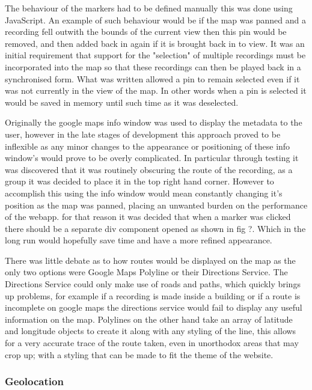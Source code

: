 \documentclass{l3proj}
\begin{document}
The behaviour of the markers had to be defined manually this was done using JavaScript. An example of such behaviour would be if the map was panned and a recording fell outwith the bounds of the current view then this pin would be removed, and then added back in again if it is brought back in to view. It was an initial requirement that support for the "selection" of multiple recordings must be incorporated into the map so that these recordings can then be played back in a synchronised form. What was written allowed a pin to remain selected even if it was not currently in the view of the map. In other words when a pin is selected it would be saved in memory until such time as it was deselected.

Originally the google maps info window was used to display the metadata to the user, however in the late stages of development this approach proved to be inflexible as any minor changes to the appearance or positioning of these info window’s would prove to be overly complicated. In particular through testing it was discovered that it was routinely obscuring the route of the recording, as a group it was decided to place it in the top right hand corner. However to accomplish this using the info window would mean constantly changing it's position as the map was panned, placing an unwanted burden on the performance of the webapp. for that reason it was decided that when a marker was clicked there should be a separate div component opened as shown in fig ?. Which in the long run would hopefully save time and have a more refined appearance.

There was little debate as to how routes would be displayed on the map as the only two options were Google Maps Polyline or their Directions Service. The Directions Service could only make use of roads and paths, which quickly brings up problems, for example if a recording is made inside a building or if a route is incomplete on google maps the directions service would fail to display any useful information on the map. Polylines on the other hand take an array of latitude and longitude objects to create it along with any styling of the line, this allows for a very accurate trace of the route taken, even in unorthodox areas that may crop up; with a styling that can be made to fit the theme of the website.

\subsubsection{Geolocation}
\end{document}
